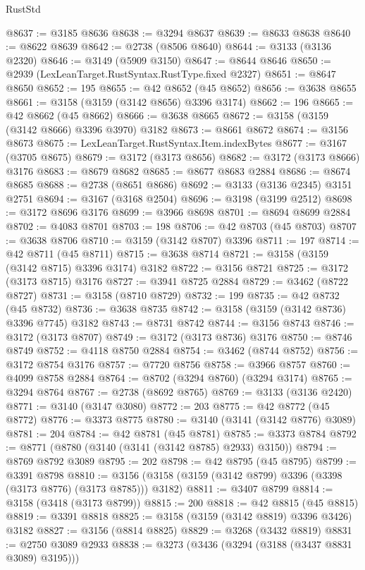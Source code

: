 \begin{lexlean}{RustStd}
\begin{coremodule}
@8637 := @3185 @8636
@8638 := @3294 @8637
@8639 := @8633 @8638
@8640 := @8622 @8639
@8642 := @2738 (@8506 @8640)
@8644 := @3133 (@3136 @2320)
@8646 := @3149 (@5909 @3150)
@8647 := @8644 @8646
@8650 := @2939 (LexLeanTarget.RustSyntax.RustType.fixed @2327)
@8651 := @8647 @8650
@8652 := 195
@8655 := @42 @8652 (@45 @8652)
@8656 := @3638 @8655
@8661 := @3158 (@3159 (@3142 @8656) @3396 @3174)
@8662 := 196
@8665 := @42 @8662 (@45 @8662)
@8666 := @3638 @8665
@8672 := @3158 (@3159 (@3142 @8666) @3396 @3970) @3182
@8673 := @8661 @8672
@8674 := @3156 @8673
@8675 := LexLeanTarget.RustSyntax.Item.indexBytes
@8677 := @3167 (@3705 @8675)
@8679 := @3172 (@3173 @8656)
@8682 := @3172 (@3173 @8666) @3176
@8683 := @8679 @8682
@8685 := @8677 @8683 @2884
@8686 := @8674 @8685
@8688 := @2738 (@8651 @8686)
@8692 := @3133 (@3136 @2345) @3151 @2751
@8694 := @3167 (@3168 @2504)
@8696 := @3198 (@3199 @2512)
@8698 := @3172 @8696 @3176
@8699 := @3966 @8698
@8701 := @8694 @8699 @2884
@8702 := @4083 @8701
@8703 := 198
@8706 := @42 @8703 (@45 @8703)
@8707 := @3638 @8706
@8710 := @3159 (@3142 @8707) @3396
@8711 := 197
@8714 := @42 @8711 (@45 @8711)
@8715 := @3638 @8714
@8721 := @3158 (@3159 (@3142 @8715) @3396 @3174) @3182
@8722 := @3156 @8721
@8725 := @3172 (@3173 @8715) @3176
@8727 := @3941 @8725 @2884
@8729 := @3462 (@8722 @8727)
@8731 := @3158 (@8710 @8729)
@8732 := 199
@8735 := @42 @8732 (@45 @8732)
@8736 := @3638 @8735
@8742 := @3158 (@3159 (@3142 @8736) @3396 @7745) @3182
@8743 := @8731 @8742
@8744 := @3156 @8743
@8746 := @3172 (@3173 @8707)
@8749 := @3172 (@3173 @8736) @3176
@8750 := @8746 @8749
@8752 := @4118 @8750 @2884
@8754 := @3462 (@8744 @8752)
@8756 := @3172 @8754 @3176
@8757 := @7720 @8756
@8758 := @3966 @8757
@8760 := @4099 @8758 @2884
@8764 := @8702 (@3294 @8760) (@3294 @3174)
@8765 := @3294 @8764
@8767 := @2738 (@8692 @8765)
@8769 := @3133 (@3136 @2420)
@8771 := @3140 (@3147 @3080)
@8772 := 203
@8775 := @42 @8772 (@45 @8772)
@8776 := @3373 @8775
@8780 := @3140 (@3141 (@3142 @8776) @3089)
@8781 := 204
@8784 := @42 @8781 (@45 @8781)
@8785 := @3373 @8784
@8792 := @8771 (@8780 (@3140 (@3141 (@3142 @8785) @2933) @3150))
@8794 := @8769 @8792 @3089
@8795 := 202
@8798 := @42 @8795 (@45 @8795)
@8799 := @3391 @8798
@8810 := @3156 (@3158 (@3159 (@3142 @8799) @3396 (@3398 (@3173 @8776) (@3173 @8785))) @3182)
@8811 := @3407 @8799
@8814 := @3158 (@3418 (@3173 @8799))
@8815 := 200
@8818 := @42 @8815 (@45 @8815)
@8819 := @3391 @8818
@8825 := @3158 (@3159 (@3142 @8819) @3396 @3426) @3182
@8827 := @3156 (@8814 @8825)
@8829 := @3268 (@3432 @8819)
@8831 := @2750 @3089 @2933
@8838 := @3273 (@3436 (@3294 (@3188 (@3437 @8831 @3089) @3195)))

\end{coremodule}
\end{lexlean}
